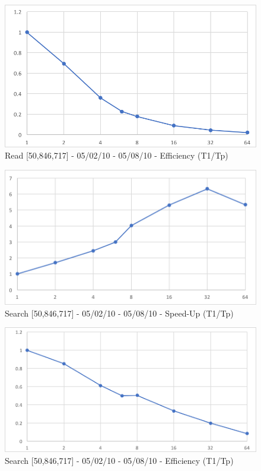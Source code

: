 \documentclass[12pt]{article} %
\begin{document}
\begin{figure}[htb]
\caption{Read [50,846,717] - 05/02/10 - 05/08/10 - Efficiency (T1/Tp)}\label{fig:benchmark01}
\centering
\includegraphics[width=15cm,keepaspectratio]{imgs/img02.png}
\end{figure} 

\begin{figure}[htb]
\caption{Search [50,846,717] - 05/02/10 - 05/08/10 - Speed-Up (T1/Tp)}\label{fig:benchmark01}
\centering
\includegraphics[width=15cm,keepaspectratio]{imgs/img03.png}
\end{figure} 

\begin{figure}[htb]
\caption{Search [50,846,717] - 05/02/10 - 05/08/10 - Efficiency (T1/Tp)}\label{fig:benchmark01}
\centering
\includegraphics[width=15cm,keepaspectratio]{imgs/img04.png}
\end{figure} 
\end{document}
